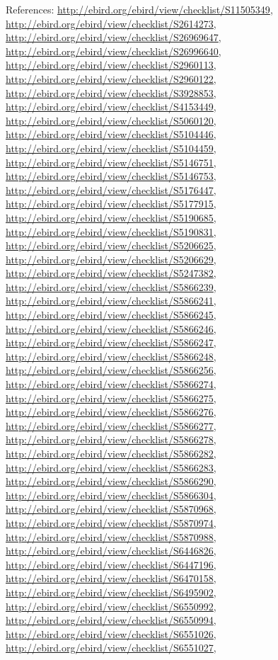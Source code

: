 \documentclass[9pt, article]{memoir}
\begin{document}
\begin{multicols}{2}
References: 
\url{http://ebird.org/ebird/view/checklist/S11505349}, 
\url{http://ebird.org/ebird/view/checklist/S2614273}, 
\url{http://ebird.org/ebird/view/checklist/S26969647}, 
\url{http://ebird.org/ebird/view/checklist/S26996640}, 
\url{http://ebird.org/ebird/view/checklist/S2960113}, 
\url{http://ebird.org/ebird/view/checklist/S2960122}, 
\url{http://ebird.org/ebird/view/checklist/S3928853}, 
\url{http://ebird.org/ebird/view/checklist/S4153449}, 
\url{http://ebird.org/ebird/view/checklist/S5060120}, 
\url{http://ebird.org/ebird/view/checklist/S5104446}, 
\url{http://ebird.org/ebird/view/checklist/S5104459}, 
\url{http://ebird.org/ebird/view/checklist/S5146751}, 
\url{http://ebird.org/ebird/view/checklist/S5146753}, 
\url{http://ebird.org/ebird/view/checklist/S5176447}, 
\url{http://ebird.org/ebird/view/checklist/S5177915}, 
\url{http://ebird.org/ebird/view/checklist/S5190685}, 
\url{http://ebird.org/ebird/view/checklist/S5190831}, 
\url{http://ebird.org/ebird/view/checklist/S5206625}, 
\url{http://ebird.org/ebird/view/checklist/S5206629}, 
\url{http://ebird.org/ebird/view/checklist/S5247382}, 
\url{http://ebird.org/ebird/view/checklist/S5866239}, 
\url{http://ebird.org/ebird/view/checklist/S5866241}, 
\url{http://ebird.org/ebird/view/checklist/S5866245}, 
\url{http://ebird.org/ebird/view/checklist/S5866246}, 
\url{http://ebird.org/ebird/view/checklist/S5866247}, 
\url{http://ebird.org/ebird/view/checklist/S5866248}, 
\url{http://ebird.org/ebird/view/checklist/S5866256}, 
\url{http://ebird.org/ebird/view/checklist/S5866274}, 
\url{http://ebird.org/ebird/view/checklist/S5866275}, 
\url{http://ebird.org/ebird/view/checklist/S5866276}, 
\url{http://ebird.org/ebird/view/checklist/S5866277}, 
\url{http://ebird.org/ebird/view/checklist/S5866278}, 
\url{http://ebird.org/ebird/view/checklist/S5866282}, 
\url{http://ebird.org/ebird/view/checklist/S5866283}, 
\url{http://ebird.org/ebird/view/checklist/S5866290}, 
\url{http://ebird.org/ebird/view/checklist/S5866304}, 
\url{http://ebird.org/ebird/view/checklist/S5870968}, 
\url{http://ebird.org/ebird/view/checklist/S5870974}, 
\url{http://ebird.org/ebird/view/checklist/S5870988}, 
\url{http://ebird.org/ebird/view/checklist/S6446826}, 
\url{http://ebird.org/ebird/view/checklist/S6447196}, 
\url{http://ebird.org/ebird/view/checklist/S6470158}, 
\url{http://ebird.org/ebird/view/checklist/S6495902}, 
\url{http://ebird.org/ebird/view/checklist/S6550992}, 
\url{http://ebird.org/ebird/view/checklist/S6550994}, 
\url{http://ebird.org/ebird/view/checklist/S6551026}, 
\url{http://ebird.org/ebird/view/checklist/S6551027}, 

\end{multicols}
\end{document}
